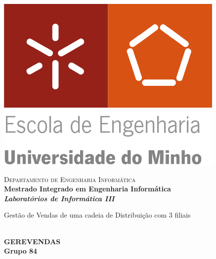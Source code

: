\begin{titlepage}


\begin{minipage}{0.3\textwidth}
\begin{flushleft} 
\includegraphics[width=\textwidth]{./logo.png}
\end{flushleft}
\end{minipage}
\begin{minipage}{0.6\textwidth}
\begin{flushright} 

\textsc{Departamento de Engenharia Informática}\\[0.1cm]
\bfseries Mestrado Integrado em Engenharia Informática \\ [0.1cm]
\bfseries \textit{Laboratórios de Informática III}\\[8mm]

\end{flushright}
\end{minipage}


\vspace{3cm}


\begin{center}


\LARGE Gestão de Vendas de uma cadeia de Distribuição com 3 filiais

\\[1.5cm]
\Large \textbf{GEREVENDAS}\\[1.5cm]


{\Large \bfseries Grupo 84\\[2cm] }



\end{center}
\end{titlepage}

